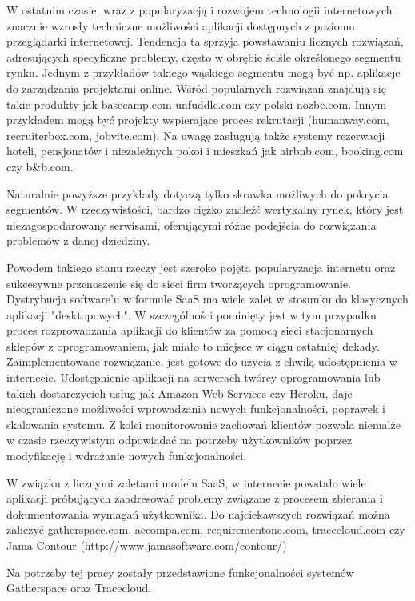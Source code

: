       W ostatnim czasie, wraz z popularyzacją i rozwojem technologii internetowych znacznie wzrosły techniczne możliwości aplikacji dostępnych z poziomu przeglądarki internetowej. Tendencja ta sprzyja powstawaniu licznych rozwiązań, adresujących specyficzne problemy, często w obrębie ściśle określonego segmentu rynku. Jednym z przykładów takiego wąskiego segmentu mogą być np. aplikacje do zarządzania projektami online. Wśród popularnych rozwiązań znajdują się takie produkty jak basecamp.com unfuddle.com czy polski nozbe.com. Innym przykładem mogą być projekty wspierające proces rekrutacji (humanway.com, recruiterbox.com, jobvite.com). Na uwagę zasługują także systemy rezerwacji hoteli, pensjonatów i niezależnych pokoi i mieszkań jak airbnb.com, booking.com czy b\&b.com. 

      Naturalnie powyższe przykłady dotyczą tylko skrawka możliwych do pokrycia segmentów. W rzeczywistości, bardzo ciężko znaleźć wertykalny rynek, który jest niezagospodarowany serwisami, oferującymi różne podejścia do rozwiązania problemów z danej dziedziny. 

      Powodem takiego stanu rzeczy jest szeroko pojęta popularyzacja internetu oraz sukcesywne przenoszenie się do sieci firm tworzących oprogramowanie. Dystrybucja software'u w formule SaaS ma wiele zalet w stosunku do klasycznych aplikacji "desktopowych". W szczególności pominięty jest w tym przypadku proces rozprowadzania aplikacji do klientów za pomocą sieci stacjonarnych sklepów z oprogramowaniem, jak miało to miejsce w ciągu ostatniej dekady. Zaimplementowane rozwiązanie, jest gotowe do użycia z chwilą udostępnienia w internecie. Udostępnienie aplikacji na serwerach twórcy oprogramowania lub takich dostarczycieli usług jak Amazon Web Services czy Heroku, daje nieograniczone możliwości wprowadzania nowych funkcjonalności, poprawek i skalowania systemu. Z kolei monitorowanie zachowań klientów pozwala niemalże w czasie rzeczywistym odpowiadać na potrzeby użytkowników poprzez modyfikację i wdrażanie nowych funkcjonalności. 

      W związku z licznymi zaletami modelu SaaS, w internecie powstało wiele aplikacji próbujących zaadresować problemy związane z procesem zbierania i dokumentowania wymagań użytkownika. Do najciekawszych rozwiązań można zaliczyć gatherspace.com, accompa.com, requirementone.com, tracecloud.com czy Jama Contour (http://www.jamasoftware.com/contour/)
    
      Na potrzeby tej pracy zostały przedstawione funkcjonalności systemów Gatherspace oraz Tracecloud.

